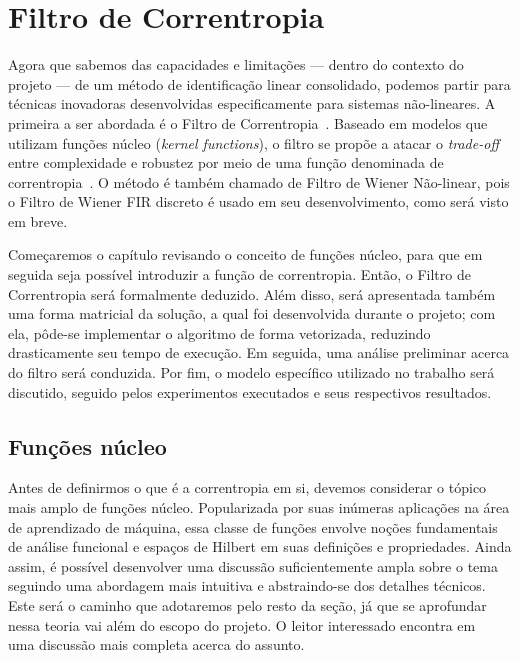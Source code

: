 \chapter{Filtro de Correntropia}
\label{chapter:correntropyfilter}

Agora que sabemos das capacidades e limitações --- dentro do contexto do projeto --- de
um método de identificação linear consolidado, podemos partir para técnicas inovadoras
desenvolvidas especificamente para sistemas não-lineares. A primeira a ser abordada é o
Filtro de Correntropia~\cite{pokharel-2006, pokharel-2007}. Baseado em modelos que
utilizam funções núcleo (\textit{kernel functions}), o filtro se propõe a atacar o
\textit{trade-off} entre complexidade e robustez por meio de uma função denominada de
correntropia~\cite{santamaria-2006}. O método é também chamado de Filtro de Wiener
Não-linear, pois o Filtro de Wiener FIR discreto é usado em seu desenvolvimento, como
será visto em breve.

Começaremos o capítulo revisando o conceito de funções núcleo, para que em seguida seja
possível introduzir a função de correntropia. Então, o Filtro de Correntropia será
formalmente deduzido. Além disso, será apresentada também uma forma matricial da
solução, a qual foi desenvolvida durante o projeto; com ela, pôde-se implementar o
algoritmo de forma vetorizada, reduzindo drasticamente seu tempo de execução. Em
seguida, uma análise preliminar acerca do filtro será conduzida. Por fim, o modelo
específico utilizado no trabalho será discutido, seguido pelos experimentos executados
e seus respectivos resultados.

\section{Funções núcleo}

Antes de definirmos o que é a correntropia em si, devemos considerar o tópico mais
amplo de funções núcleo. Popularizada por suas inúmeras aplicações na área de
aprendizado de máquina, essa classe de funções envolve noções fundamentais de análise
funcional e espaços de Hilbert em suas definições e propriedades. Ainda assim, é
possível desenvolver uma discussão suficientemente ampla sobre o tema seguindo uma
abordagem mais intuitiva e abstraindo-se dos detalhes técnicos. Este será o caminho que
adotaremos pelo resto da seção, já que se aprofundar nessa teoria vai além do escopo do
projeto. O leitor interessado encontra em~\cite{principe-2010} uma discussão mais
completa acerca do assunto.


